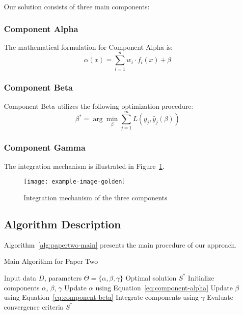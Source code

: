 Our solution consists of three main components:

\subsubsection{Component Alpha}
\lipsum[5]

The mathematical formulation for Component Alpha is:
\begin{equation}
\alpha(x) = \sum_{i=1}^{n} w_i \cdot f_i(x) + \beta
\label{eq:component-alpha}
\end{equation}

\subsubsection{Component Beta}
\lipsum[6]

Component Beta utilizes the following optimization procedure:
\begin{equation}
\beta^* = \arg\min_{\beta} \sum_{j=1}^{m} L(y_j, \hat{y}_j(\beta))
\label{eq:component-beta}
\end{equation}

\subsubsection{Component Gamma}
\lipsum[7]

The integration mechanism is illustrated in Figure~\ref{fig:papertwo-integration}.

\begin{figure}[!htb]
    \centering
    \texttt{[image: example-image-golden]}
    \caption{Integration mechanism of the three components}
    \label{fig:papertwo-integration}
\end{figure}

\subsection{Algorithm Description}

Algorithm~\ref{alg:papertwo-main} presents the main procedure of our approach.

\begin{algorithm}
\caption{Main Algorithm for Paper Two}
\label{alg:papertwo-main}
\begin{algorithmic}[1]
\Require Input data $D$, parameters $\Theta = \{\alpha, \beta, \gamma\}$
\Ensure Optimal solution $S^*$
\State Initialize components $\alpha$, $\beta$, $\gamma$
    \State Update $\alpha$ using Equation~\ref{eq:component-alpha}
    \State Update $\beta$ using Equation~\ref{eq:component-beta}
    \State Integrate components using $\gamma$
    \State Evaluate convergence criteria
\EndWhile
\State \Return $S^*$
\end{algorithmic}
\end{algorithm}

